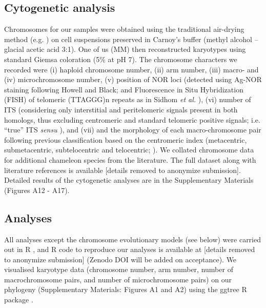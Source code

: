 \documentclass[a4paper, 12pt]{article}
\begin{document}
\subsection{Cytogenetic analysis}
Chromosomes for our samples were obtained using the traditional air-drying method (e.g. \citealt{sidhom2020karyological}) on cell suspensions preserved in Carnoy’s buffer (methyl alcohol – glacial acetic acid 3:1). 
One of us (MM) then reconstructed karyotypes using standard Giemsa coloration (5\% at pH 7). 
The chromosome characters we recorded were (i) haploid chromosome number, (ii) arm number, (iii) macro- and (iv) microchromosome number, (v) position of NOR loci (detected using Ag-NOR staining following Howell and Black; \citealt{howell1980controlled} and Fluorescence in Situ Hybridization (FISH) of telomeric (TTAGGG)n repeats as in Sidhom \textit{et al.} \citeyear{sidhom2020karyological}), (vi) number of ITS (considering only interstitial and peritelomeric signals present in both homologs, thus excluding centromeric and standard telomeric positive signals; i.e. “true” ITS \textit{sensu} \citealt{bolzan2012chromosomal,chirino2017chromosomal}), and (vii) and the morphology of each macro-chromosome pair following previous classification based on the centromeric index (metacentric, submetacentric, subtelocentric and telocentric; \citealt{levan1964nomenclature}). 
We collated chromosome data for additional chameleon species from the literature. 
The full dataset along with literature references is available [details removed to anonymize submission].
Detailed results of the cytogenetic analyses are in the Supplementary Materials (Figures A12 - A17).

\subsection{Analyses}
All analyses except the chromosome evolutionary models (see below) were carried out in R \citep{R}, and R code to reproduce our analyses is available at [details removed to anonymize submission] (Zenodo DOI will be added on acceptance). 
We visualised karyotype data (chromosome number, arm number, number of macrochromosome pairs, and number of microchromosome pairs) on our phylogeny (Supplementary Materials: Figures A1 and A2) using the ggtree R package \citep{yu2017ggtree}.
\end{document}

